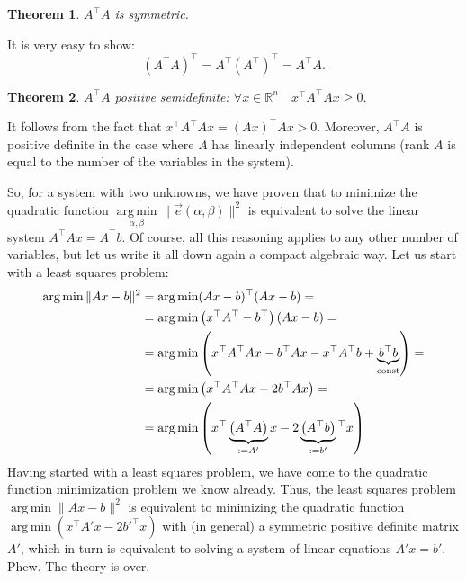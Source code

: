 \documentclass[notitlepage,oneside]{book}
\DeclareMathOperator*{\argmin}{arg\,min}
\newtheorem{theorem}{Theorem}
\begin{document}
\begin{theorem}
$A^\top A$ is symmetric.
\end{theorem}
It is very easy to show:
$$
(A^\top A)^\top = A^\top (A^\top)^\top = A^\top A.
$$

\begin{theorem}
	$A^\top A$ positive semidefinite: $\forall x\in \mathbb R^n\quad x^\top A^\top A x \geq 0.$
\end{theorem}
It follows from the fact that $x^\top A^\top A x = (A x)^\top A x > 0$.
Moreover, $A^\top A$ is positive definite in the case where $A$ has linearly independent columns (rank $A$ is equal to the number of the variables in the system).

\vspace{5mm}

So, for a system with two unknowns, we have proven that to minimize the quadratic function $\argmin\limits_{\alpha, \beta} \|\vec{e}(\alpha, \beta)\|^2$
is equivalent to solve the linear system $A^\top A x = A^\top b$.
Of course, all this reasoning applies to any other number of variables, but let us write it all down again a compact algebraic way.
Let us start with a least squares problem:
\begin{align*}
\argmin \| Ax - b \|^2 &= \argmin (Ax-b)^\top (Ax-b) =\\
& = \argmin\left(x^\top A^\top - b^\top\right)(Ax-b) = \\
& = \argmin\left(x^\top A^\top A x - b^\top Ax - x^\top A^\top b + \underbrace{b^\top b}_{\rm const}\right)=\\
& = \argmin\left(x^\top A^\top A x - 2b^\top Ax\right) = \\
& = \argmin\left(x^\top \underbrace{\left(A^\top A\right)}_{:=A'} x - 2\underbrace{\left(A^\top b\right)}_{:=b'}\phantom{}^\top x\right)
\end{align*}
Having started with a least squares problem, we have come to the quadratic function minimization problem we know already.
Thus, the least squares problem $\argmin \| Ax - b \|^2$  is equivalent to minimizing the quadratic function $\argmin \left(x^\top A' x - 2b'^\top x\right)$ 
with (in general) a symmetric positive definite matrix $A'$, which in turn is equivalent to solving a system of linear equations $A'x = b'$. Phew. The theory is over.


\end{document}
